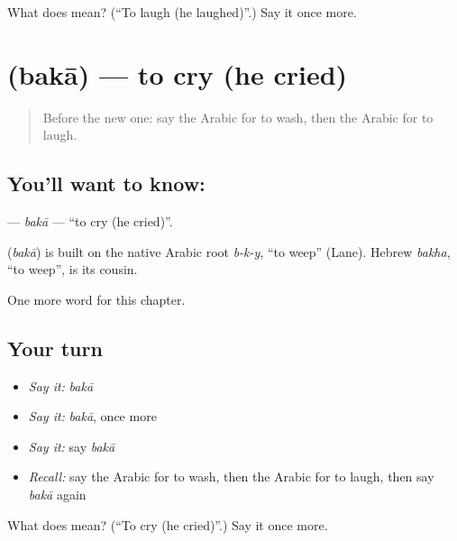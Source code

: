 \begin{tcolorbox}[breakable,colback=teal!4,colframe=teal!35!black,title={Before you move on}]
What does  mean? (\textquotedblleft{}To laugh (he laughed)\textquotedblright{}.) Say it once more.
\end{tcolorbox}
\section[\texorpdfstring{\ar{بكى} (bakā)}{بكى (bakā)}]{ (bakā) — to cry (he cried)}

\label{lesson:AR-C60-baka}



\begin{quote}
Before the new one: say the Arabic for to wash, then the Arabic for to laugh.
\end{quote}

\subsection*{You'll want to know: }
\textbf{} — \emph{bakā} — \textquotedblleft{}to cry (he cried)\textquotedblright{}.

\begin{cousinweb}
\textbf{} (\emph{bakā}) is built on the native Arabic root \emph{b-k-y}, \textquotedblleft{}to weep\textquotedblright{} (Lane). Hebrew \emph{bakha}, \textquotedblleft{}to weep\textquotedblright{}, is its cousin.
\end{cousinweb}

\begin{grammarlens}[title={What you've built}]
One more word for this chapter.
\end{grammarlens}

\subsection*{Your turn}
\begin{itemize}
\raggedright
  \item \emph{Say it:} \emph{bakā}
  \item \emph{Say it:} \emph{bakā}, once more
  \item \emph{Say it:} say \emph{bakā}
  \item \emph{Recall:} say the Arabic for to wash, then the Arabic for to laugh, then say \emph{bakā} again
\end{itemize}

\begin{tcolorbox}[breakable,colback=teal!4,colframe=teal!35!black,title={Before you move on}]
What does  mean? (\textquotedblleft{}To cry (he cried)\textquotedblright{}.) Say it once more.
\end{tcolorbox}
